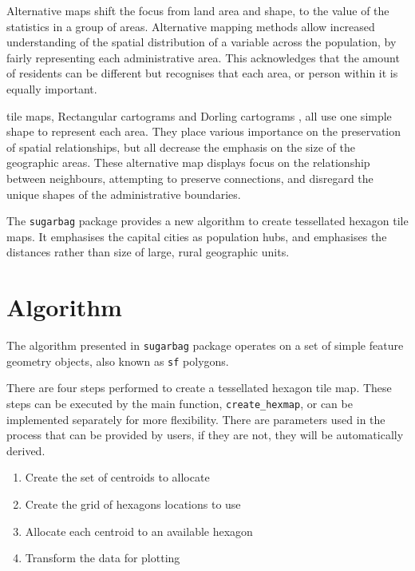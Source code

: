 \documentclass{monashthesis}
\begin{document}
Alternative maps shift the focus from land area and shape, to the value of the statistics in a group of areas.
Alternative mapping methods allow increased understanding of the spatial distribution of a variable across the population, by fairly representing each administrative area. This acknowledges that the amount of residents can be different but recognises that each area, or person within it is equally important.

tile maps, Rectangular cartograms \autocite{ORC} and Dorling cartograms \autocite{ACTUC}, all use one simple shape to represent each area. They place various importance on the preservation of spatial relationships, but all decrease the emphasis on the size of the geographic areas. These alternative map displays focus on the relationship between neighbours, attempting to preserve connections, and disregard the unique shapes of the administrative boundaries.

The \texttt{sugarbag} package provides a new algorithm to create tessellated hexagon tile maps.
It emphasises the capital cities as population hubs, and emphasises the distances rather than size of large, rural geographic units.

\hypertarget{algorithm-1}{%
\section{Algorithm}\label{algorithm-1}}

The algorithm presented in \texttt{sugarbag} package operates on a set of simple feature geometry objects, also known as \texttt{sf} \autocite{sf} polygons.

There are four steps performed to create a tessellated hexagon tile map.
These steps can be executed by the main function, \texttt{create\_hexmap}, or can be implemented separately for more flexibility. There are parameters used in the process that can be provided by users, if they are not, they will be automatically derived.

\begin{enumerate}
\def\labelenumi{\arabic{enumi}.}
\tightlist
\item
  Create the set of centroids to allocate
\item
  Create the grid of hexagons locations to use
\item
  Allocate each centroid to an available hexagon
\item
  Transform the data for plotting
\end{enumerate}
\end{document}
